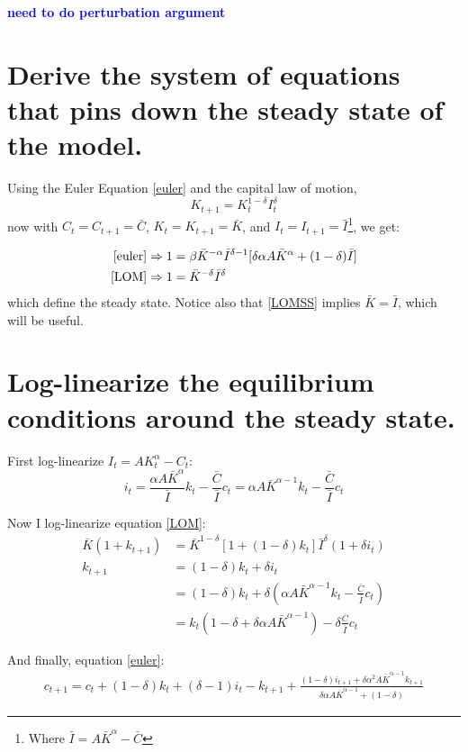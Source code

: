 \documentclass[12pt,oneside,reqno]{amsart}
\newcommand{\fix} [1] {\textbf{\textcolor{blue}{#1}}} %
\begin{document}
\fix{need to do perturbation argument} 


\section{Derive the system of equations that pins down the steady state of the model.}

Using the Euler Equation \eqref{euler} and the capital law of motion, 
\begin{equation} \label{LOM}
K_{t+1}=K_{t}^{1-\delta}I_t^\delta 
\end{equation}
now with $C_t = C_{t+1} = \bar{C}$, $K_t=K_{t+1} = \bar{K}$, and $I_t = I_{t+1} = \bar{I}$\footnote{Where $\bar{I} = A\bar{K}^\alpha -\bar{C}$}, we get:

\begin{align}
\eqref{euler} & \Rightarrow 1 = \beta \bar{K}^{-\alpha}\bar{I}^{\delta-1}[\delta\alpha A \bar{K}^\alpha + (1-\delta)\bar{I} ]
\label{eulerSS}\\
\eqref{LOM} & \Rightarrow 1 = \bar{K}^{-\delta}\bar{I}^\delta \label{LOMSS}
\end{align}
which define the steady state. Notice also that \eqref{LOMSS} implies $\bar{K} = \bar{I}$, which will be useful. 


\section{Log-linearize the equilibrium conditions around the steady state.} 
First log-linearize $I_t = AK_t^\alpha -C_t$:
\[i_t = \frac{\alpha A\bar{K}^\alpha}{\bar{I}}k_t -\frac{\bar{C}}{\bar{I}}c_t
= \alpha A\bar{K}^{\alpha-1}k_t -\frac{\bar{C}}{\bar{I}}c_t\]

Now I log-linearize equation \eqref{LOM}:
\begin{align*}
\bar{K}(1+k_{t+1}) & = \bar{K}^{1-\delta}[1+(1-\delta)k_t]\bar{I}^\delta (1+\delta i_t)
\\
k_{t+1} & = (1-\delta)k_t+\delta i_t 
\\
& = (1-\delta)k_t+\delta \left(\alpha A\bar{K}^{\alpha-1}k_t -\frac{\bar{C}}{\bar{I}}c_t\right)
\\
& = k_t\left(1-\delta +\delta\alpha A\bar{K}^{\alpha-1}\right) -\delta\frac{\bar{C}}{\bar{I}}c_t
\end{align*} 


And finally, equation \eqref{euler}:
\begin{align*}
c_{t+1} = c_t+(1-\delta)k_t+(\delta-1)i_t -k_{t+1}
    + \frac{(1-\delta)i_{t+1} +\delta\alpha^2A\bar{K}^{\alpha-1}k_{t+1}} 
        {\delta\alpha A\bar{K}^{\alpha-1} +(1-\delta)}
\end{align*}
\end{document}
